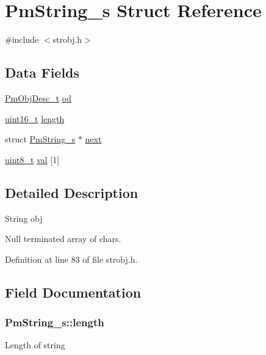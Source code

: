 \hypertarget{struct_pm_string__s}{\section{Pm\-String\-\_\-s Struct Reference}
\label{struct_pm_string__s}
}


{\ttfamily \#include $<$strobj.\-h$>$}

\subsection*{Data Fields}
\begin{DoxyCompactItemize}
\item 
\hyperlink{obj_8h_a72d816790acd8eb550fb25268c2b3489}{Pm\-Obj\-Desc\-\_\-t} \hyperlink{struct_pm_string__s_a61927674a4875d24e680f2a6201537a1}{od}
\item 
\hyperlink{stdint_8h_a273cf69d639a59973b6019625df33e30}{uint16\-\_\-t} \hyperlink{struct_pm_string__s_a385d1e58d76eb2a551bb44c72f6f6ff3}{length}
\item 
struct \hyperlink{struct_pm_string__s}{Pm\-String\-\_\-s} $\ast$ \hyperlink{struct_pm_string__s_a54ae7629000cca2b690c5d17fa4b030b}{next}
\item 
\hyperlink{stdint_8h_aba7bc1797add20fe3efdf37ced1182c5}{uint8\-\_\-t} \hyperlink{struct_pm_string__s_a668553e2db1c416ede8e9367bb123c2f}{val} \mbox{[}1\mbox{]}
\end{DoxyCompactItemize}


\subsection{Detailed Description}
String obj

Null terminated array of chars. 

Definition at line 83 of file strobj.\-h.



\subsection{Field Documentation}
\hypertarget{struct_pm_string__s_a385d1e58d76eb2a551bb44c72f6f6ff3}{
\subsubsection[{length}]{ Pm\-String\-\_\-s\-::length}}\label{struct_pm_string__s_a385d1e58d76eb2a551bb44c72f6f6ff3}
Length of string 

